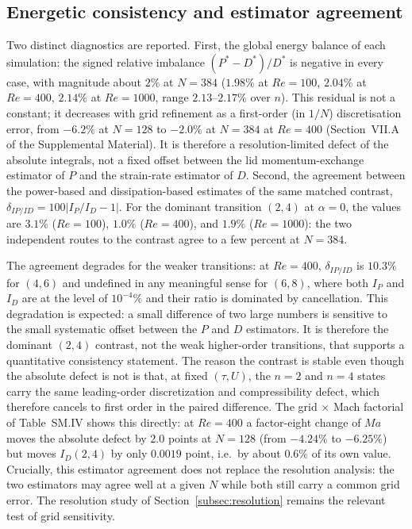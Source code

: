 \subsection{Energetic consistency and estimator agreement}
\label{subsec:consistency}

Two distinct diagnostics are reported. First, the global energy balance of each simulation: the signed relative imbalance $(P^*-D^*)/D^*$ is negative in every case, with magnitude about $2\%$ at $N=384$ ($1.98\%$ at $Re=100$, $2.04\%$ at $Re=400$, $2.14\%$ at $Re=1000$, range $2.13$--$2.17\%$ over $n$). This residual is not a constant; it decreases with grid refinement as a first-order (in $1/N$) discretisation error, from $-6.2\%$ at $N=128$ to $-2.0\%$ at $N=384$ at $Re=400$ (Section~VII.A of the Supplemental Material). It is therefore a resolution-limited defect of the absolute integrals, not a fixed offset between the lid momentum-exchange estimator of $P$ and the strain-rate estimator of $D$. Second, the agreement between the power-based and dissipation-based estimates of the same matched contrast, $\delta_{IP/ID}=100|I_P/I_D-1|$. For the dominant transition $(2,4)$ at $\alpha=0$, the values are $3.1\%$ ($Re=100$), $1.0\%$ ($Re=400$), and $1.9\%$ ($Re=1000$): the two independent routes to the contrast agree to a few percent at $N=384$.

The agreement degrades for the weaker transitions: at $Re=400$, $\delta_{IP/ID}$ is $10.3\%$ for $(4,6)$ and undefined in any meaningful sense for $(6,8)$, where both $I_P$ and $I_D$ are at the level of $10^{-4}\%$ and their ratio is dominated by cancellation. This degradation is expected: a small difference of two large numbers is sensitive to the small systematic offset between the $P$ and $D$ estimators. It is therefore the dominant $(2,4)$ contrast, not the weak higher-order transitions, that supports a quantitative consistency statement. The reason the contrast is stable even though the absolute defect is not is that, at fixed $(\tau,U)$, the $n = 2$ and $n = 4$ states carry the same leading-order discretization and compressibility defect, which therefore cancels to first order in the paired difference. The grid $\times$ Mach factorial of Table~SM.IV shows this directly: at $Re = 400$ a factor-eight change of $Ma$ moves the absolute defect by $2.0$ points at $N = 128$ (from $-4.24\%$ to $-6.25\%$) but moves $I_D(2,4)$ by only $0.0019$ point, i.e.\ by about $0.6\%$ of its own value. Crucially, this estimator agreement does not replace the resolution analysis: the two estimators may agree well at a given $N$ while both still carry a common grid error. The resolution study of Section~\ref{subsec:resolution} remains the relevant test of grid sensitivity.

